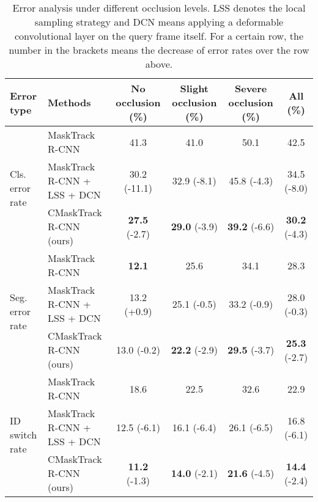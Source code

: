 \documentclass[twocolumn]{svjour3}          \smartqed  \usepackage{graphicx}
\def\myTextColor{\textcolor[rgb]{0, 0, 0}}
\begin{document}
\begin{sloppypar}
\begin{table*}[!t]
\centering
\begin{tabular}{|l|l|ccc|c|}
\hline
Error type & Methods & No occlusion (\%) & Slight occlusion (\%) & Severe occlusion (\%) & All (\%)  \\
\hline
\hline
\multirow{3}{*}{Cls. error rate} & MaskTrack R-CNN & 41.3\hspace{7.3mm} & 41.0\hspace{6.2mm} & 50.1\hspace{6.2mm} & 42.5\hspace{6.2mm} \\
& MaskTrack R-CNN + LSS + DCN & 30.2 \scriptsize{(-11.1)} & 32.9 \scriptsize{(-8.1)} & 45.8 \scriptsize{(-4.3)} & 34.5 \scriptsize{(-8.0)} \\
& CMaskTrack R-CNN (ours) & \textbf{27.5} \scriptsize{(-\hspace{1.2mm}2.7)} & \textbf{29.0} \scriptsize{(-3.9)} & \textbf{39.2} \scriptsize{(-6.6)} & \textbf{30.2} \scriptsize{(-4.3)} \\
\hline
\multirow{3}{*}{Seg. error rate} & MaskTrack R-CNN & \textbf{12.1}\hspace{7.3mm} & 25.6\hspace{6.2mm} & 34.1\hspace{6.2mm} & 28.3\hspace{6.2mm} \\
& MaskTrack R-CNN + LSS + DCN & 13.2 \scriptsize{(+\hspace{0.6mm}0.9)} & 25.1 \scriptsize{(-0.5)} & 33.2 \scriptsize{(-0.9)} & 28.0 \scriptsize{(-0.3)} \\
& CMaskTrack R-CNN (ours) & 13.0 \scriptsize{(-\hspace{1.2mm}0.2)} & \textbf{22.2} \scriptsize{(-2.9)} & \textbf{29.5} \scriptsize{(-3.7)} & \textbf{25.3} \scriptsize{(-2.7)} \\
\hline
\multirow{3}{*}{ID switch rate} & MaskTrack R-CNN & 18.6\hspace{7.7mm} & 22.5\hspace{6.2mm} & 32.6\hspace{6.2mm} & 22.9\hspace{6.2mm} \\
& MaskTrack R-CNN + LSS + DCN & 12.5 \scriptsize{(-\hspace{1.2mm}6.1)} & 16.1 \scriptsize{(-6.4)} & 26.1 \scriptsize{(-6.5)} & 16.8 \scriptsize{(-6.1)} \\
& CMaskTrack R-CNN (ours) & \textbf{11.2} \scriptsize{(-\hspace{1.2mm}1.3)} & \textbf{14.0} \scriptsize{(-2.1)} & \textbf{21.6} \scriptsize{(-4.5)} & \textbf{14.4} \scriptsize{(-2.4)} \\
\hline
\end{tabular}
\caption{Error analysis under different occlusion levels. LSS denotes the local sampling strategy and DCN means applying a deformable convolutional layer on the query frame itself. \myTextColor{For a certain row, the number in the brackets means the decrease of error rates over the row above.}}
\label{error_analysis}
\end{table*}


\end{sloppypar}
\end{document}
